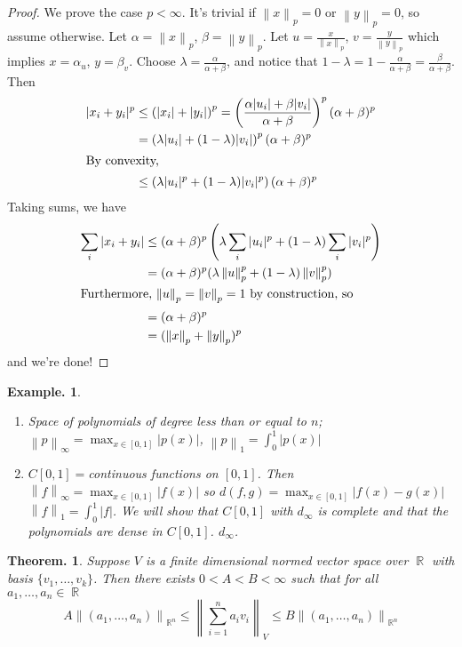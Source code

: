 \documentclass[11pt, a4paper]{memoir}
\DeclareMathOperator{\R}{{\mathbb{R}}}
\newcommand{\norm}[1]{\ensuremath{\left\lVert#1\right\rVert}}
\theoremstyle{change}
\newtheorem{theorem}{Theorem.}[section]
\theoremstyle{plain}
\theoremstyle{nonumberplain}
\newtheorem{example}{Example.}
\newtheorem{proof}{Proof}
\numberwithin{equation}{section}
\begin{document}
\begin{proof}
    We prove the case $p<\infty$. It's trivial if $\norm{x}_p=0$ or $\norm{y}_p=0$, so assume otherwise. Let $\alpha=\norm{x}_p$,
    $\beta=\norm{y}_p$. Let $u=\frac{x}{\norm{x}_p}$, $v=\frac{y}{\norm{y}_p}$ which implies $x=\alpha_u$, $y=\beta_v$.
    Choose $\lambda=\frac{\alpha}{\alpha+\beta}$, and notice that $1-\lambda=1-\frac{\alpha}{\alpha+\beta}=\frac{\beta}{\alpha+\beta}$.
    Then
    \begin{align*}
        |x_i+y_i|^p &\leq \left( |x_i|+|y_i| \right)^p = \left( \frac{\alpha|u_i|+\beta|v_i|}{\alpha+\beta} \right)^p(\alpha+\beta)^p\\
        &= \left( \lambda|u_i|+(1-\lambda)|v_i| \right)^p(\alpha+\beta)^p\\
        \intertext{By convexity,}
        &\leq \left( \lambda|u_i|^p+(1-\lambda)|v_i|^p \right)(\alpha+\beta)^p
    \end{align*}
    Taking sums, we have
    \begin{align*}
        \sum\limits_i|x_i+y_i| &\leq (\alpha+\beta)^p\left( \lambda\sum\limits_i|u_i|^p+(1-\lambda)\sum\limits_i|v_i|^p \right)\\
        &= (\alpha+\beta)^p(\lambda\norm{u}_p^p+(1-\lambda)\norm{v}_p^p)\\
        \intertext{Furthermore, $\norm{u}_p=\norm{v}_p=1$ by construction, so}
        &= (\alpha+\beta)^p\\
        &= (\norm{x}_p+\norm{y}_p)^p
    \end{align*}
    and we're done!
\end{proof}
\begin{example}
    \begin{enumerate}
        \item Space of polynomials of degree less than or equal to $n$; $\norm{p}_\infty=\max_{x\in[0,1]}|p(x)|$, $\norm{p}_1=\int_0^1|p(x)|$
        \item $C[0,1]=$continuous functions on $[0,1]$.
            Then $\norm{f}_\infty=\max_{x\in[0,1]}|f(x)|$ so $d(f,g)=\max_{x\in[0,1]}|f(x)-g(x)|$ $\norm{f}_1=\int_0^1|f|$.
            We will show that $C[0,1]$ with $d_\infty$ is complete and that the polynomials are dense in $C[0,1]$.
            $d_\infty$.
    \end{enumerate}
\end{example}
\begin{theorem}
    Suppose $V$ is a finite dimensional normed vector space over $\R$ with basis $\{v_1,\ldots,v_k\}$.
    Then there exists $0<A<B<\infty$ such that for all $a_1,\ldots,a_n\in\R$
    \begin{equation*}
        A\norm{(a_1,\ldots,a_n)}_{\R^n}\leq \norm{\sum\limits_{i=1}^na_iv_i}_V\leq B\norm{(a_1,\ldots,a_n)}_{\R^n}
    \end{equation*}
\end{theorem}
\end{document}
